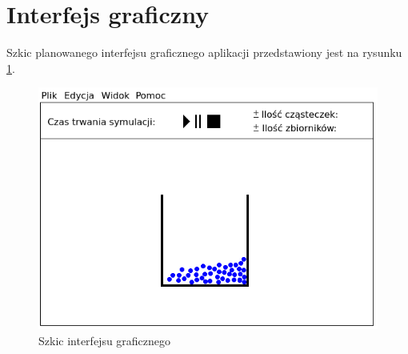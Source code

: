
\section{Interfejs graficzny}
Szkic planowanego interfejsu graficznego aplikacji przedstawiony jest na rysunku \ref{fig:szkic_interfejsu}.

\begin{figure}[H]
 \begin{center} 
  \includegraphics[width=.8\textwidth] {rysunki/ekran.png} 
 \end{center}
 \caption{Szkic interfejsu graficznego}
 \label{fig:szkic_interfejsu} 
\end{figure} 